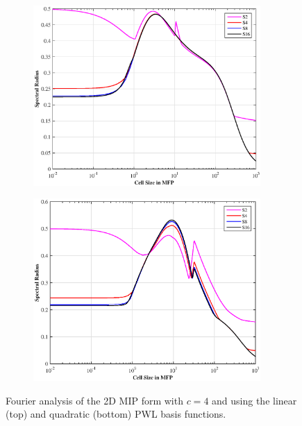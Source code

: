 \begin{figure}
\centering
	\begin{subfigure}[b]{0.80\textwidth}
		\centering
		\includegraphics[width=0.95\textwidth]{figures/sec_DSA/SI_MIP_quad_C=4_PWLD1_LS.eps}
	\end{subfigure}
	\vfill
	\begin{subfigure}[b]{0.80\textwidth}
		\centering
		\includegraphics[width=0.95\textwidth]{figures/sec_DSA/SI_MIP_quad_C=4_UPWLD2_LS.eps}
	\end{subfigure}
\caption{Fourier analysis of the 2D MIP form with $c=4$ and using the linear (top) and quadratic (bottom) PWL basis functions.}
\label{fig::DSA_2D1G_Fourier_PWL}
\end{figure}

